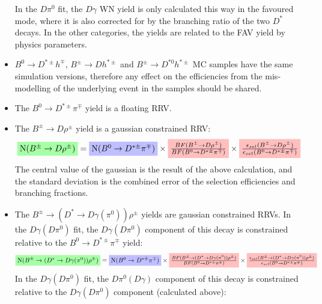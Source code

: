 \documentclass[12pt, landscape]{article}
\begin{document}
\begin{itemize}
  In the $D\pi^0$ fit, the $D\gamma$ WN yield is only calculated this way in the
  favoured mode, where it is also corrected for by the branching ratio of the
  two $D^*$ decays. In the other categories, the yields are related to the FAV
  yield by physics parameters.  \item $B^0\rightarrow D^{*\pm}h^{\mp}$,
  $B^{\pm}\rightarrow Dh^{*\pm}$ and $B^{\pm}\rightarrow D^{*0}h^{*\pm}$ MC
  samples have the same simulation versions, therefore any effect on the
  efficiencies from the mis-modelling of the underlying event in the samples
  should be shared.
  \item The $B^0\rightarrow D^{*\pm}\pi^{\mp}$ yield is a floating RRV.
  \item The $B^{\pm}\rightarrow D\rho^{\pm}$ yield is a gaussian constrained RRV:
    \begin{equation*}
      \colorbox{green!35}{\text{N($B^{\pm}\rightarrow D\rho^{\pm}$)}} =
      \colorbox{blue!25}{\text{N($B^0\rightarrow D^{*\pm}\pi^{\mp}$)}} \times 
      \colorbox{pink}{$\frac{BF(B^{\pm}\rightarrow
      D\rho^{\pm})}{BF(B^0\rightarrow D^{*\pm}\pi^{\mp})}$} \times
      \colorbox{pink}{$\frac{\epsilon_{sel}(B^{\pm}\rightarrow
      D\rho^{\pm})}{\epsilon_{sel}(B^0\rightarrow D^{*\pm}\pi^{\mp})}$}
    \end{equation*}
    The central value of the gaussian is the result of the above calculation,
    and the standard deviation is the combined error of the selection
    efficiencies and branching fractions.
  \item The $B^{\pm}\rightarrow (D^*\rightarrow D\gamma(\pi^0))\rho^{\pm}$
    yields are gaussian constrained RRVs. In the $D\gamma(D\pi^0)$ fit, the
    $D\gamma(D\pi^0)$ component of this decay is constrained relative to the
    $B^0\rightarrow D^{*\pm}\pi^{\mp}$ yield:
    \begin{equation*}
      \colorbox{green!35}{\text{N($B^{\pm}\rightarrow (D^*\rightarrow
      D\gamma(\pi^0))\rho^{\pm}$)}} =
      \colorbox{blue!25}{\text{N($B^0\rightarrow D^{*\pm}\pi^{\mp}$)}} \times 
      \colorbox{pink}{$\frac{BF(B^{\pm}\rightarrow (D^*\rightarrow
      D\gamma(\pi^0))\rho^{\pm})}{BF(B^0\rightarrow D^{*\pm}\pi^{\mp})}$} \times
      \colorbox{pink}{$\frac{\epsilon_{sel}(B^{\pm}\rightarrow (D^*\rightarrow
      D\gamma(\pi^0))\rho^{\pm})}{\epsilon_{sel}(B^0\rightarrow
      D^{*\pm}\pi^{\mp})}$}
    \end{equation*}
    In the $D\gamma(D\pi^0)$ fit, the $D\pi^0(D\gamma)$ component of this decay
  is constrained relative to the $D\gamma(D\pi^0)$ component (calculated above):

\end{itemize}
\end{document}
